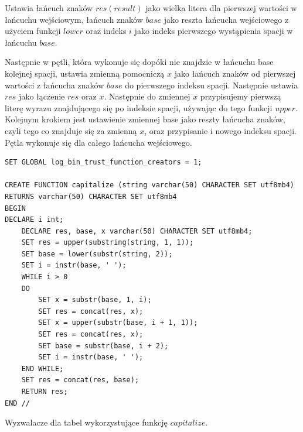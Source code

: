 \documentclass[12pt,a4paper]{article}
\begin{document}
    Ustawia łańcuch znaków $res(result)$ jako wielka litera dla pierwszej wartości w łańcuchu wejściowym, łańcuch znaków $base$ jako reszta łańcucha wejściowego z użyciem funkcji $lower$ oraz indeks $i$ jako indeks pierwszego wystąpienia spacji w łańcuchu $base$.
    
    Następnie w pętli, która wykonuje się dopóki nie znajdzie w łańcuchu base kolejnej spacji, ustawia zmienną pomocniczą $x$ jako łańcuch znaków od pierwszej wartości z łańcucha znaków $base$ do pierwszego indeksu spacji. Następnie ustawia $res$ jako łączenie $res$ oraz $x$. Następnie do zmiennej $x$ przypisujemy pierwszą literę wyrazu znajdującego się po indeksie spacji, używając do tego funkcji $upper$. Kolejnym krokiem jest ustawienie zmiennej base jako reszty łańcucha znaków, czyli tego co znajduje się za zmienną $x$, oraz przypisanie i nowego indeksu spacji. Pętla wykonuje się dla całego łańcucha wejściowego.
    \begin{Verbatim}
SET GLOBAL log_bin_trust_function_creators = 1;    
    
CREATE FUNCTION capitalize (string varchar(50) CHARACTER SET utf8mb4)
RETURNS varchar(50) CHARACTER SET utf8mb4
BEGIN
DECLARE i int;
	DECLARE res, base, x varchar(50) CHARACTER SET utf8mb4;
	SET res = upper(substring(string, 1, 1));
	SET base = lower(substr(string, 2));
	SET i = instr(base, ' ');
	WHILE i > 0
	DO
		SET x = substr(base, 1, i);
		SET res = concat(res, x);
		SET x = upper(substr(base, i + 1, 1));
		SET res = concat(res, x);
		SET base = substr(base, i + 2);
		SET i = instr(base, ' ');
	END WHILE;
	SET res = concat(res, base);
	RETURN res;
END //
    \end{Verbatim}
    Wyzwalacze dla tabel wykorzystujące funkcję $capitalize$.
\end{document}
